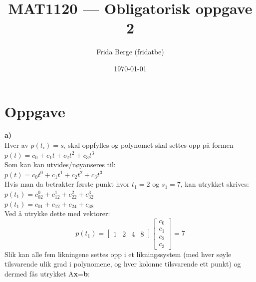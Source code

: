 \documentclass[12pt,norsk,a4paper]{article}
\author{Frida Berge (fridatbe)}
\title{MAT1120 --- Obligatorisk oppgave 2}
\date{\today}
\begin{document}
    \maketitle
    \renewcommand{\thesubsection}{(\alph{subsection})}
    \newpage

    \section{Oppgave}
    \textbf{a)}\\

        Hver av $p(t_i) = s_i$ skal oppfylles og polynomet skal settes opp på formen\\
        $p(t) = c_0 + c_1t + c_2t^2+c_3t^3$\\
        Som kan kan utvides/nøyanseres til:\\
        $p(t) = c_0t^0 + c_1t^1 + c_2t^2+c_3t^3$\\
        Hvis man da betrakter første punkt hvor $t_1 = 2$ og $s_1 = 7$, kan utrykket skrives:\\
        $p(t_1) = c_02^0 + c_12^1 + c_22^2+c_32^3$\\
        $p(t_1) = c_01 + c_12 + c_24+c_38$\\
        Ved å utrykke dette med vektorer:\\
        \[p(t_1)= \left[ \begin{array}{cccc}1 & 2 & 4 & 8\end{array} \right] \left[ \begin{array}{c}c_0 \\ c_1 \\ c_2 \\ c_3\end{array} \right] = 7\]
        Slik kan alle fem likningene settes opp i et likningssystem (med hver søyle tilsvarende ulik grad i polynomene, og hver kolonne tilsvarende ett punkt) og dermed fås utrykket A\textbf{x}=\textbf{b}:\\
\end{document}
